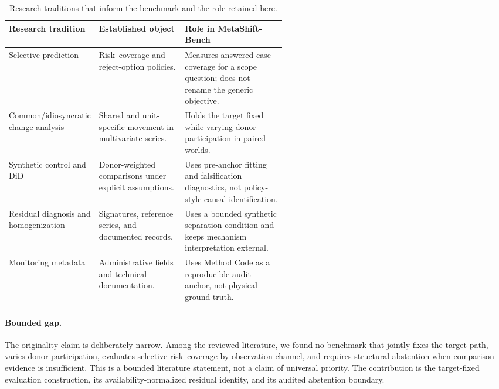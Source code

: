 \begin{table}[tbp]
\centering
\caption{Research traditions that inform the benchmark and the role retained
here.}
\label{tab:related-work-boundary}
\small
\begin{tabularx}{\linewidth}{@{}p{0.24\linewidth}p{0.31\linewidth}X@{}}
\toprule
Research tradition & Established object & Role in MetaShift-Bench \\
\midrule
Selective prediction \citep{chow1970,geifman2017} & Risk--coverage and
reject-option policies. & Measures answered-case coverage for a scope
question; does not rename the generic objective. \\
\addlinespace
Common/idiosyncratic change analysis \citep{bai1998,barigozzi2018} & Shared
and unit-specific movement in multivariate series. & Holds the target fixed
while varying donor participation in paired worlds. \\
\addlinespace
Synthetic control and DiD \citep{abadie2010,arkhangelsky2021} & Donor-weighted
comparisons under explicit assumptions. & Uses pre-anchor fitting and
falsification diagnostics, not policy-style causal identification. \\
\addlinespace
Residual diagnosis and homogenization \citep{chowwillsky1984,menne2009} &
Signatures, reference series, and documented records. & Uses a bounded
synthetic separation condition and keeps mechanism interpretation external. \\
\addlinespace
Monitoring metadata \citep{epa_method_code,epa_poc} & Administrative fields
and technical documentation. & Uses Method Code as a reproducible audit anchor,
not physical ground truth. \\
\bottomrule
\end{tabularx}
\end{table}

\paragraph{Bounded gap.}
The originality claim is deliberately narrow. Among the reviewed literature, we
found no benchmark that jointly fixes the target path, varies donor
participation, evaluates selective risk--coverage by observation channel, and
requires structural abstention when comparison evidence is insufficient. This
is a bounded literature statement, not a claim of universal priority. The
contribution is the target-fixed evaluation construction, its
availability-normalized residual identity, and its audited abstention boundary.
